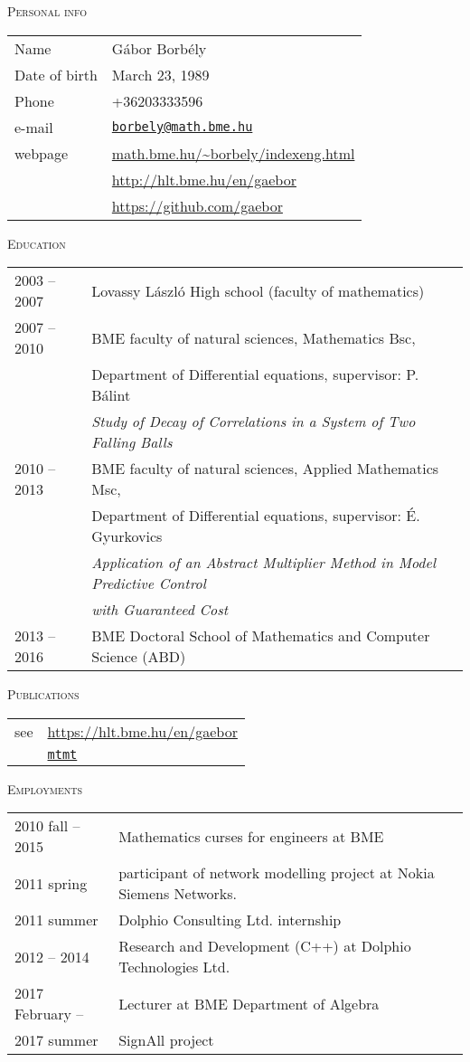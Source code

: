 \documentclass[12pt]{article}
\newcommand\mail[1]{\href{mailto:#1}{\texttt{#1}}}
\begin{document}
 \thispagestyle{empty}
 
\textsc{Personal info}

       \begin{tabular}{p{3cm}l}
	       Name & Gábor Borbély\\
           Date of birth & March 23, 1989\\
		   Phone &  +36203333596\\
		   e-mail & \mail{borbely@math.bme.hu}\\
		   webpage& \url{math.bme.hu/~borbely/indexeng.html} \\
                  & \url{http://hlt.bme.hu/en/gaebor} \\
                  & \url{https://github.com/gaebor}
       \end{tabular}

 \textsc{Education}

       \begin{tabular}{p{3cm}l}
	       2003 -- 2007 & Lovassy László High school (faculty of mathematics) \\
           2007 -- 2010& BME faculty of natural sciences, Mathematics Bsc, \\
		              & Department of Differential equations, supervisor: P. Bálint\\
					  & \emph{Study of Decay of Correlations in a System of Two Falling Balls} \\
		   2010 -- 2013 & BME faculty of natural sciences, Applied Mathematics Msc,\\
						& Department of Differential equations, supervisor: É. Gyurkovics\\
						& \emph{Application of an Abstract Multiplier Method in Model Predictive Control}\\ & \emph{ with Guaranteed Cost} \\
		    2013 -- 2016 & BME Doctoral School of Mathematics and Computer Science (ABD)
       \end{tabular}

 \textsc{Publications}

        \begin{tabular}{p{3cm}l}
	       see & \url{https://hlt.bme.hu/en/gaebor} \\ 
               &  \href{https://m2.mtmt.hu/gui2/?type=authors&mode=browse&sel=10043154}{\texttt{mtmt}}
       \end{tabular}

 \textsc{Employments}

       \begin{tabular}{p{4cm}l}
	       2010 fall -- 2015 & Mathematics curses for engineers at BME\\
           2011 spring  & participant of network modelling project at Nokia Siemens Networks. \\
		   2011 summer    & Dolphio Consulting Ltd. internship\\
		   2012 -- 2014 & Research and Development (C++) at Dolphio Technologies Ltd. \\
           2017 February -- & Lecturer at BME Department of Algebra \\
           2017 summer & SignAll project
       \end{tabular}
\end{document}
